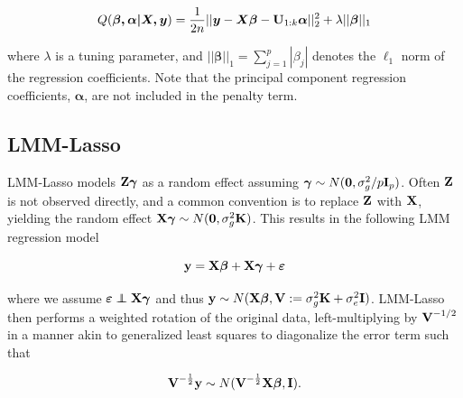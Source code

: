 \begin{equation}
    \label{eqn:pca_obj}
    Q(\boldsymbol{\beta, \alpha| X, y}) = \frac{1}{2n} ||\boldsymbol{y} - \boldsymbol{X \beta} - \textbf{U}_{1:k}\boldsymbol{\alpha}||_2^2 + \lambda || \boldsymbol{\beta} ||_1
\end{equation}

where $\lambda$ is a tuning parameter, and $|| \boldsymbol{\beta} ||_1 = \sum_{j=1}^p |\beta_j|$ denotes the $\ell_1$ norm of the regression coefficients.  Note that the principal component regression coefficients, $\boldsymbol{\alpha}$, are not included in the penalty term. 




\subsection{LMM-Lasso}
LMM-Lasso models $\textbf{Z}\boldsymbol{\gamma}$ as a random effect assuming $\boldsymbol{\gamma} \sim N(\boldsymbol{0}, \sigma^2_g / p \textbf{I}_p)$. Often $\textbf{Z}$ is not observed directly, and a common convention is to replace $\textbf{Z}$ with $\textbf{X}$, yielding the random effect $\textbf{X}\boldsymbol{\gamma} \sim N(\boldsymbol{0}, \sigma^2_g \textbf{K})$.  This results in the following LMM regression model

\begin{equation}
    \label{eqn:lmm_reg}
    \textbf{y} = \textbf{X}\boldsymbol{\beta} + \textbf{X}\boldsymbol{\gamma}+ \boldsymbol{\varepsilon}
\end{equation}

where we assume $\beps \independent \bX\bgamma$ and thus $\textbf{y}  \sim N(\textbf{X} \boldsymbol{\beta}, \textbf{V} := \sigma^2_g \textbf{K} + \sigma^2_e \textbf{I})$. LMM-Lasso then performs a weighted rotation of the original data, left-multiplying by $\textbf{V}^{-1/2}$ in a manner akin to generalized least squares to diagonalize the error term such that

\begin{equation}
\textbf{V}^{-\frac{1}{2}}\textbf{y} \sim N(\textbf{V}^{-\frac{1}{2}}\textbf{X} \boldsymbol{\beta}, \textbf{I}).
\end{equation}


